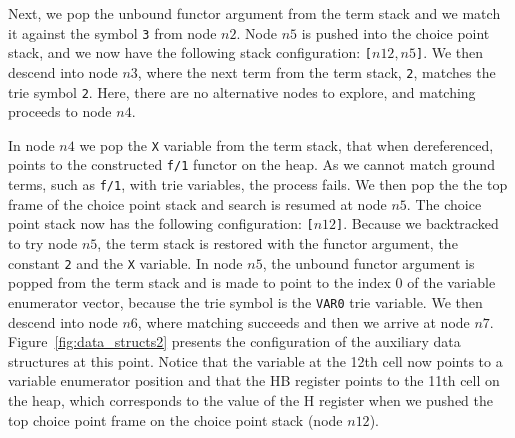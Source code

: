 Next, we pop the unbound functor argument from the term stack and we match it
against the symbol \texttt{3} from node $n2$. Node $n5$ is pushed into the choice
point stack, and we now have the following stack configuration: \texttt{[$n12,n5$]}.
We then descend into node $n3$, where the next term from the term stack, \texttt{2},
matches the trie symbol \texttt{2}. Here, there are no alternative nodes to explore,
and matching proceeds to node $n4$.

In node $n4$ we pop the \texttt{X} variable from the term stack, that when dereferenced,
points to the constructed \texttt{f/1} functor on the heap. As we cannot match ground
terms, such as \texttt{f/1}, with trie variables, the process fails. We then pop the
the top frame of the choice point stack and search is resumed at
node $n5$. The choice point stack now has the following configuration: \texttt{[$n12$]}.
Because we backtracked to try node $n5$, the term stack is restored with the functor
argument, the constant \texttt{2} and the \texttt{X} variable. In node $n5$, the unbound
functor argument is popped from the term stack and is made to point to the index 0 of the
variable enumerator vector, because the trie symbol is the \texttt{VAR0} trie variable.
We then descend into node $n6$, where matching succeeds and then we arrive at node $n7$.
Figure~\ref{fig:data_structs2} presents the configuration of the auxiliary data structures
at this point. Notice that the variable at the 12th cell now points to a variable enumerator
position and that the HB register points to the 11th cell on the heap, which corresponds to
the value of the H register when we pushed the top choice point frame on the choice point
stack (node $n12$).

